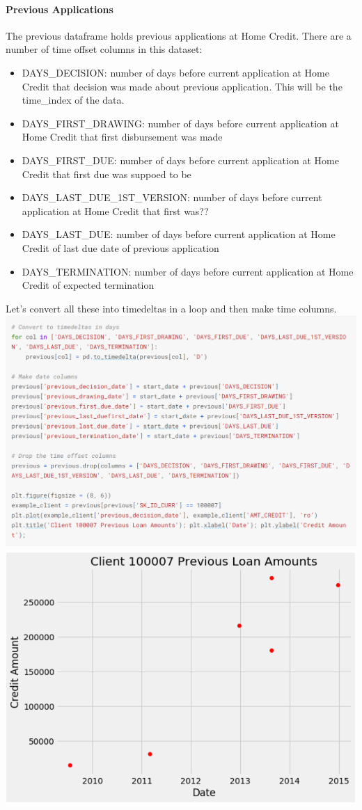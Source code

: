 \documentclass[twoside,a4paper]{article}
\begin{document}
\paragraph{Previous Applications}
The previous dataframe holds previous applications at Home Credit. There are a number of time offset columns in this dataset:\\
\begin{itemize}
 \item  DAYS\_DECISION: number of days before current application at Home Credit that decision was made about previous application. This will be the time\_index of the data.
 \item DAYS\_FIRST\_DRAWING: number of days before current application at Home Credit that first disbursement was made
 \item DAYS\_FIRST\_DUE: number of days before current application at Home Credit that first due was suppoed to be
 \item DAYS\_LAST\_DUE\_1ST\_VERSION: number of days before current application at Home Credit that first was??
 \item DAYS\_LAST\_DUE: number of days before current application at Home Credit of last due date of previous application
 \item DAYS\_TERMINATION: number of days before current application at Home Credit of expected termination
\end{itemize}
Let's convert all these into timedeltas in a loop and then make time columns.\\
\includegraphics[scale=.8]{load11.png}
\includegraphics[scale=.8]{load12.png}
\end{document}
